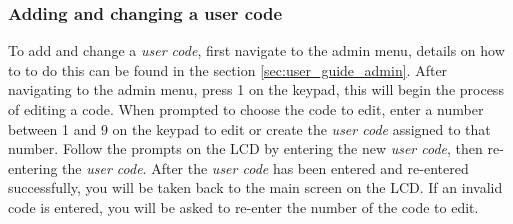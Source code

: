 \subsubsection{Adding and changing a user code}\label{sec:user_guide_user}
  To add and change a \textit{user code}, first navigate to the admin menu, details on how to to do this can be found in the section \ref{sec:user_guide_admin}.
  After navigating to the admin menu, press 1 on the keypad, this will begin the process of editing a code.
  When prompted to choose the code to edit, enter a number between 1 and 9 on the keypad to edit or create the \textit{user code} assigned to that number.
  Follow the prompts on the LCD by entering the new \textit{user code}, then re-entering the \textit{user code}.
  After the \textit{user code} has been entered and re-entered successfully, you will be taken back to the main screen on the LCD.
  If an invalid code is entered, you will be asked to re-enter the number of the code to edit.
  

